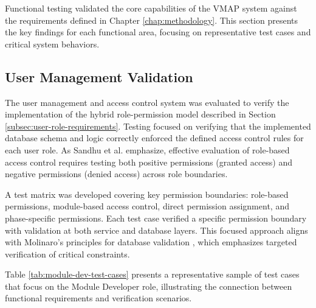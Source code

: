 Functional testing validated the core capabilities of the VMAP system against the requirements defined in Chapter \ref{chap:methodology}. This section presents the key findings for each functional area, focusing on representative test cases and critical system behaviors.

\subsection{User Management Validation}
\label{subsec:user-management-validation}

The user management and access control system was evaluated to verify the implementation of the hybrid role-permission model described in Section \ref{subsec:user-role-requirements}. Testing focused on verifying that the implemented database schema and logic correctly enforced the defined access control rules for each user role. As Sandhu et al. \cite{sandhu1998role} emphasize, effective evaluation of role-based access control requires testing both positive permissions (granted access) and negative permissions (denied access) across role boundaries.

A test matrix was developed covering key permission boundaries: role-based permissions, module-based access control, direct permission assignment, and phase-specific permissions. Each test case verified a specific permission boundary with validation at both service and database layers. This focused approach aligns with Molinaro's principles for database validation \cite{molinaro2005sql}, which emphasizes targeted verification of critical constraints.

Table \ref{tab:module-dev-test-cases} presents a representative sample of test cases that focus on the Module Developer role, illustrating the connection between functional requirements and verification scenarios.


